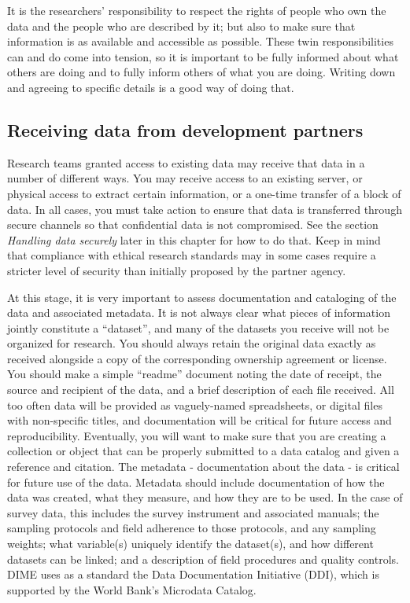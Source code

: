 It is the researchers' responsibility to respect the rights
of people who own the data and the people who are described by it;
but also to make sure that information is as available and accessible as possible.
These twin responsibilities can and do come into tension,
so it is important to be fully informed about what others are doing
and to fully inform others of what you are doing.
Writing down and agreeing to specific details is a good way of doing that.

\subsection{Receiving data from development partners}

Research teams granted access to existing data may receive that data in a number of different ways.
You may receive access to an existing server, 
or physical access to extract certain information, 
or a one-time transfer of a block of data.
In all cases, you must take action to ensure 
that data is transferred through 
secure channels so that confidential data is not compromised.
See the section \textit{Handling data securely} later in this chapter for how to do that.
Keep in mind that compliance with ethical research standards may 
in some cases require a stricter level of security than initially proposed by the partner agency.

At this stage, it is very important to assess
documentation and cataloging of the data and associated metadata.
It is not always clear what pieces of information jointly constitute a ``dataset'',
and many of the datasets you receive will not be organized for research.
You should always retain the original data exactly as received
alongside a copy of the corresponding ownership agreement or license.
You should make a simple ``readme'' document noting the date of receipt,
the source and recipient of the data, 
and a brief description of each file received.
All too often data will be provided as vaguely-named spreadsheets,
or digital files with non-specific titles, 
and documentation will be critical for future access and reproducibility.
Eventually, you will want to make sure that you are creating a collection or object
that can be properly submitted to a data catalog and given a reference and citation.
The metadata - documentation about the data - is critical for future use of the data.
Metadata should include documentation of how the data was created, 
what they measure, and how they are to be used.
In the case of survey data, this includes the survey instrument and associated manuals; 
the sampling protocols and field adherence to those protocols, and any sampling weights;
what variable(s) uniquely identify the dataset(s), and how different datasets can be linked;
and a description of field procedures and quality controls. 
DIME uses as a standard the Data Documentation Initiative (DDI), which is supported by the 
World Bank's Microdata Catalog.

